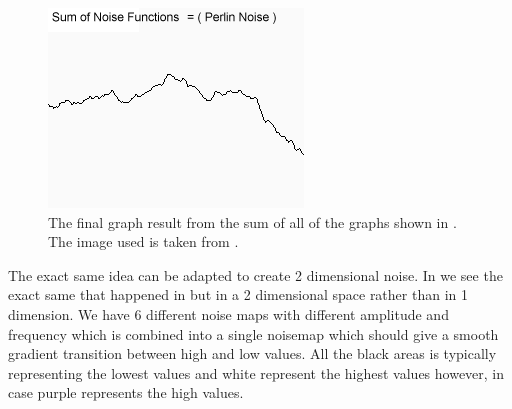 \begin{figure}[H]
	\includegraphics[width=0.5\linewidth]{img/perlin1}
	\centering
	\caption{The final graph result from the sum of all of the graphs shown in . The image used is taken from \cite{perlinnoise2}.}
	\label{fig:1DNoiseResult}
\end{figure}

The exact same idea can be adapted to create 2 dimensional noise. In  we see the exact same that happened in  but in a 2 dimensional space rather than in 1 dimension. We have 6 different noise maps with different amplitude and frequency which is combined into a single noisemap which should give a smooth gradient transition between high and low values. All the black areas is typically representing the lowest values and white represent the highest values however, in  case purple represents the high values.

